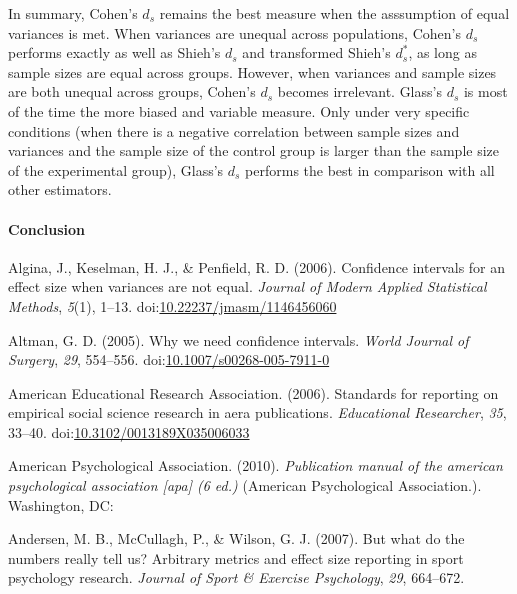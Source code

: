 \documentclass[
  man,floatsintext]{apa6}
\begin{document}
In summary, Cohen's \(d_s\) remains the best measure when the asssumption of equal variances is met. When variances are unequal across populations, Cohen's \(d_s\) performs exactly as well as Shieh's \(d_s\) and transformed Shieh's \(d^*_s\), as long as sample sizes are equal across groups. However, when variances and sample sizes are both unequal across groups, Cohen's \(d_s\) becomes irrelevant. Glass's \(d_s\) is most of the time the more biased and variable measure. Only under very specific conditions (when there is a negative correlation between sample sizes and variances and the sample size of the control group is larger than the sample size of the experimental group), Glass's \(d_s\) performs the best in comparison with all other estimators.

\hypertarget{conclusion}{%
\paragraph{Conclusion}\label{conclusion}}

\hypertarget{refs}{}
\leavevmode\hypertarget{ref-Algina_et_al_2006}{}%
Algina, J., Keselman, H. J., \& Penfield, R. D. (2006). Confidence intervals for an effect size when variances are not equal. \emph{Journal of Modern Applied Statistical Methods}, \emph{5}(1), 1--13. doi:\href{https://doi.org/10.22237/jmasm/1146456060}{10.22237/jmasm/1146456060}

\leavevmode\hypertarget{ref-Altman_2005}{}%
Altman, G. D. (2005). Why we need confidence intervals. \emph{World Journal of Surgery}, \emph{29}, 554--556. doi:\href{https://doi.org/10.1007/s00268-005-7911-0}{10.1007/s00268-005-7911-0}

\leavevmode\hypertarget{ref-AERA_2006}{}%
American Educational Research Association. (2006). Standards for reporting on empirical social science research in aera publications. \emph{Educational Researcher}, \emph{35}, 33--40. doi:\href{https://doi.org/10.3102/0013189X035006033}{10.3102/0013189X035006033}

\leavevmode\hypertarget{ref-APA_2010}{}%
American Psychological Association. (2010). \emph{Publication manual of the american psychological association {[}apa{]} (6 ed.)} (American Psychological Association.). Washington, DC:

\leavevmode\hypertarget{ref-Andersen_et_al_2007}{}%
Andersen, M. B., McCullagh, P., \& Wilson, G. J. (2007). But what do the numbers really tell us? Arbitrary metrics and effect size reporting in sport psychology research. \emph{Journal of Sport \& Exercise Psychology}, \emph{29}, 664--672.
\end{document}
